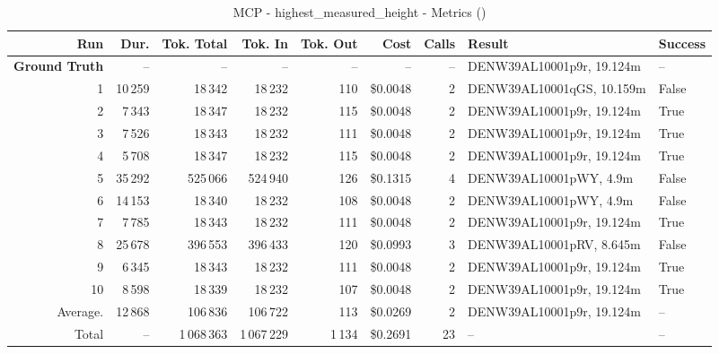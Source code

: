 \documentclass[a4paper,11pt]{article}
\begin{document}
\begin{table}[ht]
\centering
\scriptsize
\caption{MCP - highest\_measured\_height - Metrics ()}
\label{tab:mcp\_highest\_measured\_height\_metrics\_}
\begin{tabular}{r r r r r r r p{3cm} l}
\hline
Run & Dur. & Tok. Total & Tok. In & Tok. Out & Cost & Calls & Result & Success \\
\hline
\textbf{Ground Truth} & -- & -- & -- & -- & -- & -- & DENW39AL10001p9r, 19.124m & -- \\
\hline
1 & 10\,259 & 18\,342 & 18\,232 & 110 & \$0.0048 & 2 & DENW39AL10001qGS, 10.159m & False \\
2 & 7\,343 & 18\,347 & 18\,232 & 115 & \$0.0048 & 2 & DENW39AL10001p9r, 19.124m & True \\
3 & 7\,526 & 18\,343 & 18\,232 & 111 & \$0.0048 & 2 & DENW39AL10001p9r, 19.124m & True \\
4 & 5\,708 & 18\,347 & 18\,232 & 115 & \$0.0048 & 2 & DENW39AL10001p9r, 19.124m & True \\
5 & 35\,292 & 525\,066 & 524\,940 & 126 & \$0.1315 & 4 & DENW39AL10001pWY, 4.9m & False \\
6 & 14\,153 & 18\,340 & 18\,232 & 108 & \$0.0048 & 2 & DENW39AL10001pWY, 4.9m & False \\
7 & 7\,785 & 18\,343 & 18\,232 & 111 & \$0.0048 & 2 & DENW39AL10001p9r, 19.124m & True \\
8 & 25\,678 & 396\,553 & 396\,433 & 120 & \$0.0993 & 3 & DENW39AL10001pRV, 8.645m & False \\
9 & 6\,345 & 18\,343 & 18\,232 & 111 & \$0.0048 & 2 & DENW39AL10001p9r, 19.124m & True \\
10 & 8\,598 & 18\,339 & 18\,232 & 107 & \$0.0048 & 2 & DENW39AL10001p9r, 19.124m & True \\
\hline
Average. & 12\,868 & 106\,836 & 106\,722 & 113 & \$0.0269 & 2 & DENW39AL10001p9r, 19.124m & -- \\
Total & -- & 1\,068\,363 & 1\,067\,229 & 1\,134 & \$0.2691 & 23 & -- & -- \\
\hline
\end{tabular}
\end{table}

\clearpage
\end{document}
